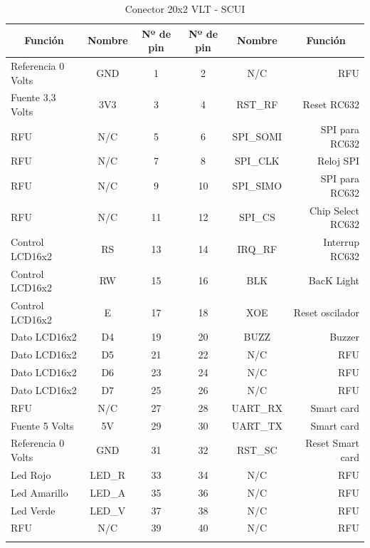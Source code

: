 \begin{longtable}{|l|c|c|c|c|r|}
\hline
\multicolumn{1}{|c|}{\textbf{Función}} & \textbf{Nombre} & \textbf{Nº de pin} & \textbf{Nº de pin} & \textbf{Nombre} & \multicolumn{1}{c|}{\textbf{Función}} \\ \hline
Referencia 0 Volts & GND & 1 & 2 & N/C & RFU \\ \hline
Fuente 3,3 Volts & 3V3 & 3 & 4 & RST\_RF & Reset RC632 \\ \hline
RFU & N/C & 5 & 6 & SPI\_SOMI & SPI para RC632 \\ \hline
RFU & N/C & 7 & 8 & SPI\_CLK & Reloj SPI \\ \hline
RFU & N/C & 9 & 10 & SPI\_SIMO & SPI para RC632 \\ \hline
RFU & N/C & 11 & 12 & SPI\_CS & Chip Select RC632 \\ \hline
Control LCD16x2 & RS & 13 & 14 & IRQ\_RF & Interrup RC632 \\ \hline
Control LCD16x2 & RW & 15 & 16 & BLK & BacK Light \\ \hline
Control LCD16x2 & E & 17 & 18 & XOE & Reset oscilador \\ \hline
Dato LCD16x2 & D4 & 19 & 20 & BUZZ & Buzzer \\ \hline
Dato LCD16x2 & D5 & 21 & 22 & N/C & RFU \\ \hline
Dato LCD16x2 & D6 & 23 & 24 & N/C & RFU \\ \hline
Dato LCD16x2 & D7 & 25 & 26 & N/C & RFU \\ \hline
RFU & N/C & 27 & 28 & UART\_RX & Smart card \\ \hline
Fuente 5 Volts & 5V & 29 & 30 & UART\_TX & Smart card \\ \hline
Referencia 0 Volts & GND & 31 & 32 & RST\_SC & Reset Smart card \\ \hline
Led Rojo & LED\_R & 33 & 34 & N/C & RFU \\ \hline
Led Amarillo & LED\_A & 35 & 36 & N/C & RFU \\ \hline
Led Verde & LED\_V & 37 & 38 & N/C & RFU \\ \hline
RFU & N/C & 39 & 40 & N/C & RFU \\ \hline
\caption{Conector 20x2 VLT - SCUI}\label{c_SCUI}
\end{longtable}



